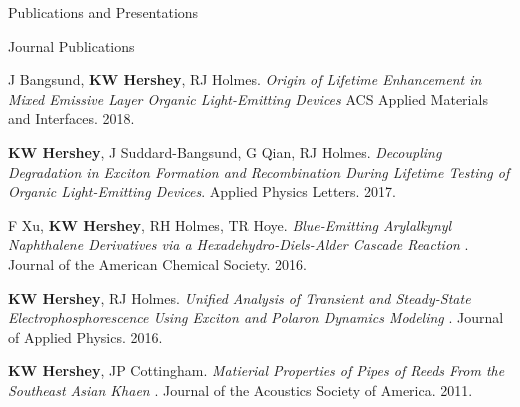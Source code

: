 \documentclass{resume} %
\begin{document}

\begin{rSection}{Publications and Presentations}
\begin{rSubsection}{Journal Publications}{}{}{}
\item J Bangsund, \textbf{KW Hershey}, RJ Holmes. {\em Origin of Lifetime Enhancement in Mixed Emissive Layer Organic Light-Emitting Devices} ACS Applied Materials and Interfaces. 2018.
\item  \textbf{KW Hershey}, J Suddard-Bangsund, G Qian, RJ Holmes. {\em Decoupling Degradation in Exciton Formation and Recombination During Lifetime Testing of Organic Light-Emitting Devices}. Applied Physics Letters. 2017.
\item F Xu, \textbf{KW Hershey}, RH Holmes, TR Hoye. {\em Blue-Emitting Arylalkynyl Naphthalene Derivatives via a Hexadehydro-Diels-Alder Cascade Reaction} . Journal of the American Chemical Society. 2016.
\item \textbf{KW Hershey}, RJ Holmes. {\em Unified Analysis of Transient and Steady-State Electrophosphorescence Using Exciton and Polaron Dynamics Modeling} . Journal of Applied Physics. 2016.
\item \textbf{KW Hershey}, JP Cottingham. {\em Matierial Properties of Pipes of Reeds From the Southeast Asian Khaen} . Journal of the Acoustics Society of America. 2011.

\end{rSubsection}



\end{rSection}
\end{document}
